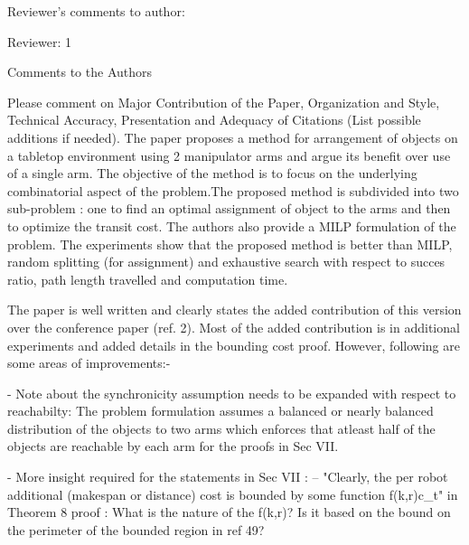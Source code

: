 \documentclass[journal]{IEEEtran}
\begin{document}
	\begin{partt}
		Reviewer's comments to author:
		
		Reviewer: 1
		
		Comments to the Authors
		
		Please comment on Major Contribution of the Paper, Organization and Style, Technical Accuracy, Presentation and Adequacy of Citations (List possible additions if needed).
		The paper proposes a method for arrangement of objects on a tabletop environment using 2 manipulator arms and argue its benefit over use of a single arm. The objective of the method is to focus on the underlying combinatorial aspect of the problem.The proposed method is subdivided into two sub-problem : one to find an optimal assignment of object to the arms and then to optimize the transit cost. The authors also provide a MILP formulation of the problem. The experiments show that the proposed method is better than MILP, random splitting (for assignment) and exhaustive search with respect to succes ratio, path length travelled and computation time.
		
		The paper is well written and clearly states the added contribution of this version over the conference paper (ref. 2). Most of the added contribution is in additional experiments and added details in the bounding cost proof. However, following are some areas of improvements:-
		
	\end{partt}
	
	\begin{partt}	
		- Note about the synchronicity assumption needs to be expanded with respect to reachabilty: The problem formulation assumes a balanced or nearly balanced distribution of the objects to two arms which enforces that atleast half of the objects are reachable by each arm for the proofs in Sec VII.
	\end{partt}
	\begin{partt}
		
		- More insight required for the statements in Sec VII :
		-- "Clearly, the per robot additional (makespan or distance) cost is bounded by some function f(k,r)c\_t" in Theorem 8 proof : What is the nature of the f(k,r)? Is it based on the bound on the perimeter of the bounded region in ref 49?
	\end{partt}
	
\end{document}
